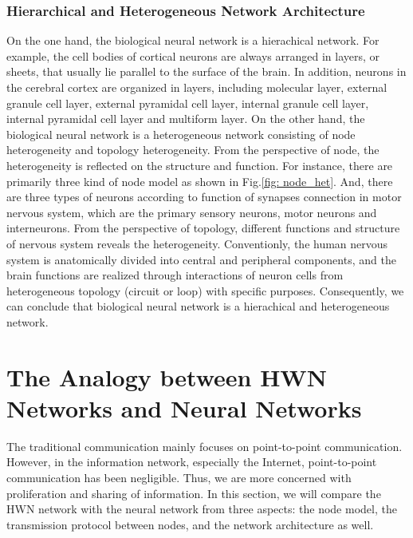 \documentclass[journal,comsoc]{IEEEtran}
\begin{document}
			\subsubsection{Hierarchical and Heterogeneous Network Architecture}			
				On the one hand, the biological neural network is a hierachical network.
				For example, the cell bodies of cortical neurons are always arranged in layers, or sheets, that usually lie parallel to the surface of the brain\cite{bear2007neuroscience}.
				In addition, neurons in the cerebral cortex are organized in layers, including molecular layer, external granule cell layer, external pyramidal cell layer, internal granule cell layer, internal pyramidal cell layer and multiform layer. 
				On the other hand, the biological neural network is a heterogeneous network consisting of node heterogeneity and topology heterogeneity.
				From the perspective of node,  the heterogeneity is reflected on the structure and function.
				For instance, there are primarily three kind of node model as shown in Fig.\ref{fig: node_het}.
				And, there are three types of neurons according to function of synapses connection in motor nervous system, which are the primary sensory neurons, motor neurons and interneurons.
				From the perspective of topology, different functions and structure of nervous system reveals the heterogeneity.
				Conventionly, the human nervous system is anatomically divided into central and peripheral components, 
				and the brain functions are realized through interactions of neuron cells from heterogeneous topology (circuit or loop) with specific purposes\cite{kandel2000principles}.
				Consequently, we can conclude that biological neural network is a hierachical and heterogeneous network.
	
	\section{The Analogy between HWN Networks and Neural Networks}
	\label{section: analogy}
		The traditional communication mainly focuses on point-to-point communication.
		However, in the information network, especially the Internet, point-to-point communication has been negligible. 
		Thus, we are more concerned with proliferation and sharing of information.
		In this section, we will compare the HWN network with the neural network from three aspects: the node model, the transmission protocol between nodes, and the network architecture as well.
		
\end{document}
